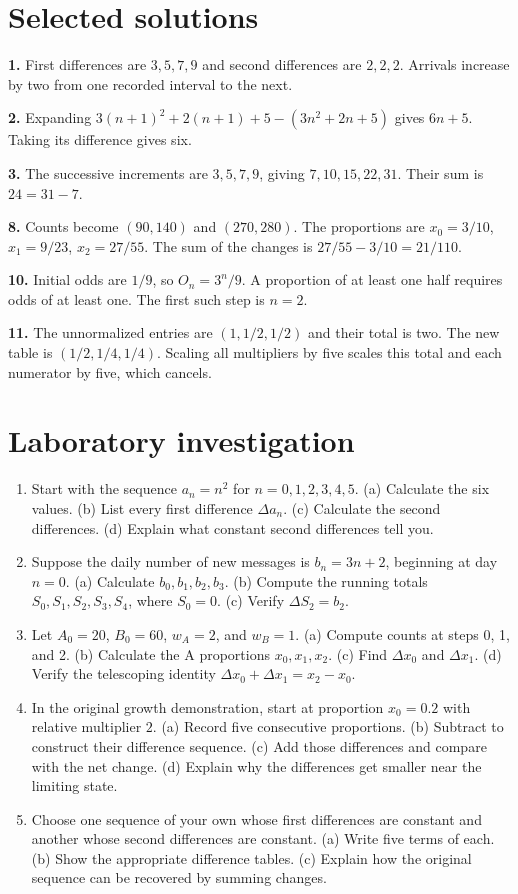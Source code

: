 \documentclass[11pt,oneside,openany]{book}
\theoremstyle{definition}
\theoremstyle{remark}
\numberwithin{equation}{chapter}
\providecommand{\tightlist}{\setlength{\itemsep}{0pt}\setlength{\parskip}{0pt}}
\newcommand{\labheading}{\FloatBarrier\section*{Laboratory investigation}\addcontentsline{toc}{section}{Laboratory investigation}}
\begin{document}
\section{Selected solutions}\label{ch01-selected-solutions}

\textbf{1.} First differences are \(3,5,7,9\) and second differences are \(2,2,2\). Arrivals increase by two from one recorded interval to the next.

\textbf{2.} Expanding \(3(n+1)^2+2(n+1)+5-(3n^2+2n+5)\) gives \(6n+5\). Taking its difference gives six.

\textbf{3.} The successive increments are \(3,5,7,9\), giving \(7,10,15,22,31\). Their sum is \(24=31-7\).

\textbf{8.} Counts become \((90,140)\) and \((270,280)\). The proportions are \(x_0=3/10\), \(x_1=9/23\), \(x_2=27/55\). The sum of the changes is \(27/55-3/10=21/110\).

\textbf{10.} Initial odds are \(1/9\), so \(O_n=3^n/9\). A proportion of at least one half requires odds of at least one. The first such step is \(n=2\).

\textbf{11.} The unnormalized entries are \((1,1/2,1/2)\) and their total is two. The new table is \((1/2,1/4,1/4)\). Scaling all multipliers by five scales this total and each numerator by five, which cancels.
\labheading\begin{enumerate}
\def\labelenumi{\arabic{enumi}.}
\tightlist
\item
  Start with the sequence \(a_n=n^2\) for \(n=0,1,2,3,4,5\). (a) Calculate the six values. (b) List every first difference \(\Delta a_n\). (c) Calculate the second differences. (d) Explain what constant second differences tell you.
\item
  Suppose the daily number of new messages is \(b_n=3n+2\), beginning at day \(n=0\). (a) Calculate \(b_0,b_1,b_2,b_3\). (b) Compute the running totals \(S_0,S_1,S_2,S_3,S_4\), where \(S_0=0\). (c) Verify \(\Delta S_2=b_2\).
\item
  Let \(A_0=20\), \(B_0=60\), \(w_A=2\), and \(w_B=1\). (a) Compute counts at steps 0, 1, and 2. (b) Calculate the A proportions \(x_0,x_1,x_2\). (c) Find \(\Delta x_0\) and \(\Delta x_1\). (d) Verify the telescoping identity \(\Delta x_0+\Delta x_1=x_2-x_0\).
\item
  In the original growth demonstration, start at proportion \(x_0=0.2\) with relative multiplier \(2\). (a) Record five consecutive proportions. (b) Subtract to construct their difference sequence. (c) Add those differences and compare with the net change. (d) Explain why the differences get smaller near the limiting state.
\item
  Choose one sequence of your own whose first differences are constant and another whose second differences are constant. (a) Write five terms of each. (b) Show the appropriate difference tables. (c) Explain how the original sequence can be recovered by summing changes.
\end{enumerate}
\end{document}
